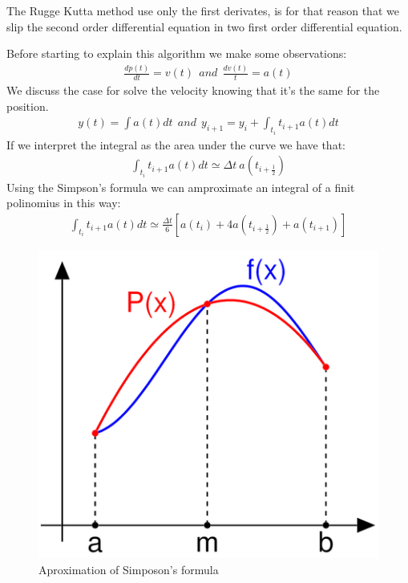 \documentclass[a4paper]{article}
\begin{document}
The Rugge Kutta method use only the first derivates, is for that reason that we slip the second order differential equation in two first order differential equation. 

Before starting to explain this algorithm we make some observations: 
\begin{align}
\frac{dp(t)}{dt} = v(t) \ \ and \ \ \frac{dv(t)}{t} = a(t) 
\end{align}
We discuss the case for solve the velocity knowing that it's the same for the position.
\begin{align}
y(t) = \int a(t)dt \ \ and \  \ y_{i+1} = y_i + \int_{t_i}{t_{i+1}} a(t)dt
\end{align}
If we interpret the integral as the area under the curve we have that:
\begin{align}
\int_{t_i}{t_{i+1}} a(t)dt \simeq \Delta t \  a(t_{i+\frac{1}{2}})
\end{align}
Using the Simpson's formula we can amproximate an integral of a finit polinomius in this way: 
\begin{align}
\int_{t_i}{t_{i+1}} a(t)dt \simeq \frac{\Delta t}{6} \left [ a(t_i)+4a(t_{i+\frac{1}{2}})+ a(t_{i+1}) \right ] 
\end{align}


\begin{figure}
\centering
\includegraphics[scale=0.3]{sim_int.png}
\caption{Aproximation of Simposon's formula}
\end{figure}
\end{document}

